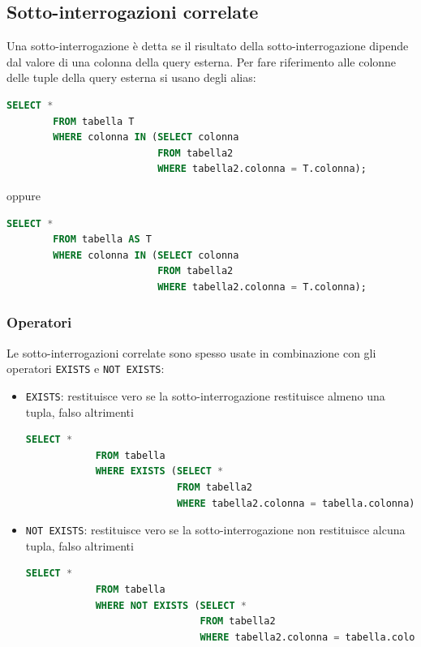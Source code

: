 \documentclass[12pt, a4paper]{report}
\begin{document}
    \subsection{Sotto-interrogazioni correlate}
    Una sotto-interrogazione è detta  se il risultato della sotto-interrogazione dipende dal valore di una colonna della query esterna. Per fare riferimento alle colonne delle tuple della query esterna si usano degli alias:
    \begin{lstlisting}[language=SQL]
        SELECT *
        FROM tabella T
        WHERE colonna IN (SELECT colonna
                          FROM tabella2
                          WHERE tabella2.colonna = T.colonna);
    \end{lstlisting}
    oppure
    \begin{lstlisting}[language=SQL]
        SELECT *
        FROM tabella AS T
        WHERE colonna IN (SELECT colonna
                          FROM tabella2
                          WHERE tabella2.colonna = T.colonna);
    \end{lstlisting}
    \subsubsection{Operatori}
    Le sotto-interrogazioni correlate sono spesso usate in combinazione con gli operatori \texttt{EXISTS} e \texttt{NOT EXISTS}:
    \begin{itemize}
        \item \texttt{EXISTS}: restituisce vero se la sotto-interrogazione restituisce almeno una tupla, falso altrimenti \begin{lstlisting}[language=SQL]
            SELECT *
            FROM tabella
            WHERE EXISTS (SELECT *
                          FROM tabella2
                          WHERE tabella2.colonna = tabella.colonna);
        \end{lstlisting}
        \item \texttt{NOT EXISTS}: restituisce vero se la sotto-interrogazione non restituisce alcuna tupla, falso altrimenti \begin{lstlisting}[language=SQL]
            SELECT *
            FROM tabella
            WHERE NOT EXISTS (SELECT *
                              FROM tabella2
                              WHERE tabella2.colonna = tabella.colonna);
        \end{lstlisting}
    \end{itemize}
\end{document}

